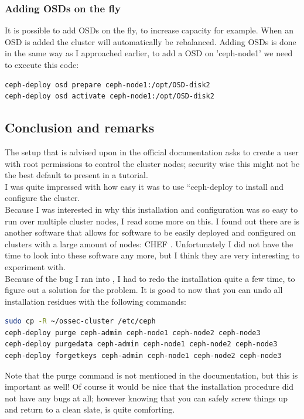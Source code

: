 \documentclass[12pt]{report}
\begin{document}
\subsubsection{Adding OSDs on the fly}
It is possible to add OSDs on the fly, to increase capacity for
example. When an OSD is added the cluster will automatically be
rebalanced.
Adding OSDs is done in the same way as I approached earlier,
to add a OSD on 'ceph-node1' we need to execute this code:
\begin{lstlisting}[language=bash]
ceph-deploy osd prepare ceph-node1:/opt/OSD-disk2
ceph-deploy osd activate ceph-node1:/opt/OSD-disk2
\end{lstlisting}

\subsection{Conclusion and remarks}
The setup that is advised upon in the official documentation asks to
create a user with root permissions to control the cluster nodes;
security wise this might not be the best default to present in a tutorial.\\
I was quite impressed with how easy it was to use ``ceph-deploy
to install and configure the cluster. \\
Because I was interested in why
this installation and configuration was so easy to run over multiple
cluster nodes, I read some more on this. I found out there are
is another software that allows for software to be easily deployed and
configured on clusters with a large amount of nodes: CHEF
\cite{chef_soft}. Unfortunately I
did not have the time to look into these software any more, but I
think they are very interesting to experiment with.\\
Because of the bug I ran into \cite{ceph_bug_1}, I had to redo the
installation quite a few time, to figure out a solution for the
problem.
It is good to now that you can undo all installation residues with the
following commands:
\begin{lstlisting}[language=bash]
sudo cp -R ~/ossec-cluster /etc/ceph
ceph-deploy purge ceph-admin ceph-node1 ceph-node2 ceph-node3
ceph-deploy purgedata ceph-admin ceph-node1 ceph-node2 ceph-node3
ceph-deploy forgetkeys ceph-admin ceph-node1 ceph-node2 ceph-node3
\end{lstlisting}
Note that the purge command is not mentioned in the documentation, but
this is important as well!
Of course it would be nice that the installation procedure did not have any bugs
at all; however knowing that you can safely screw things up and return to a
clean slate, is quite comforting.\\
\end{document}
